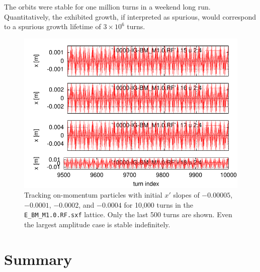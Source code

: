\documentclass[]{article}
\begin{document}
The orbits were stable for one million turns in a weekend long
run. Quantitatively, the exhibited growth, if
interpreted as spurious, would correspond to a spurious growth lifetime
of $3\times10^6$ turns.
%
\begin{figure}[h]
\centering
\includegraphics[scale=1.3]{pdf/LongTerm_x_M1p0.pdf}
\caption{\label{fig:LongTerm_x_M1.0}Tracking on-momentum particles
with initial $x'$ slopes of $-0.00005$, $-0.0001$, $-0.0002$,  
and $-0.0004$ for 10,000 turns in the {\tt E\_BM\_M1.0.RF.sxf} 
lattice. Only the last 500 turns are shown. Even the largest
amplitude case is stable indefinitely.
}
\end{figure}
%

\section{Summary}
\end{document}
